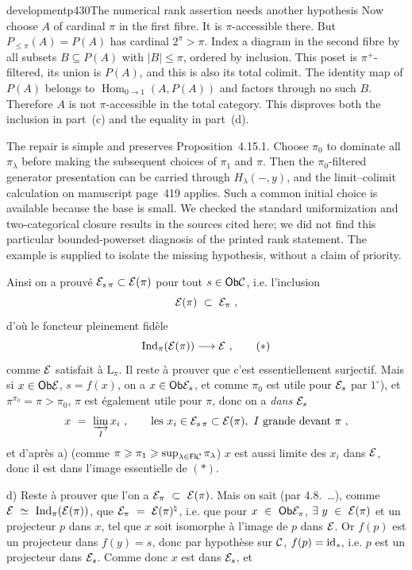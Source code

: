 \begin{dcomment}{development}{p430}{The numerical rank assertion needs another hypothesis}
Now choose $A$ of cardinal $\pi$ in the first fibre. It is $\pi$-accessible there. But $P_{\leq\pi}(A)=P(A)$ has cardinal $2^\pi>\pi$. Index a diagram in the second fibre by all subsets $B\subseteq P(A)$ with $|B|\leq\pi$, ordered by inclusion. This poset is $\pi^+$-filtered, its union is $P(A)$, and this is also its total colimit. The identity map of $P(A)$ belongs to $\operatorname{Hom}_{0\to1}(A,P(A))$ and factors through no such $B$. Therefore $A$ is not $\pi$-accessible in the total category. This disproves both the inclusion in part~(c) and the equality in part~(d).\par

The repair is simple and preserves Proposition~4.15.1. Choose $\pi_0$ to dominate all $\pi_\lambda$ before making the subsequent choices of $\pi_1$ and $\pi$. Then the $\pi_0$-filtered generator presentation can be carried through $H_\lambda(-,y)$, and the limit--colimit calculation on manuscript page~419 applies. Such a common initial choice is available because the base is small. We checked the standard uniformization and two-categorical closure results in the sources cited here; we did not find this particular bounded-powerset diagnosis of the printed rank statement. The example is supplied to isolate the missing hypothesis, without a claim of priority.
\end{dcomment}


Ainsi on a prouvé $\mathcal{E}_{s\,\pi} \subset \mathcal{E}(\pi)$ pour tout $s \in \mathsf{Ob} \mathcal{C}$, i.e. l'inclusion
\[
\cE(\pi) \ \subset \ \cE_{\pi} \ ,
\]
d'où le foncteur pleinement fidèle
\[
\Ind_{\pi}(\cE(\pi)) \longrightarrow \cE \ , \tag*{$(*)$}
\]
comme $\mathcal{E}$ satisfait à $\mathrm{L}_{\pi}$. Il reste à prouver que c'est essentiellement surjectif. Mais si $x \in \mathsf{Ob} \mathcal{E}$, $s = f(x)$, on a $x \in \mathsf{Ob} \mathcal{E}_s$, et comme $\pi_0$ est utile pour $\mathcal{E}_s$ par $1^{\circ}$), et $\pi^{\pi_0} = \pi > \pi_0$,
$\pi$ est également utile pour $\pi$, donc on a \textit{dans} $\mathcal{E}_s$ %
\[
x \ = \ \varinjlim_{I} x_i \ , \qquad \text{les } x_i \in \cE_{s\,\pi} \subset \cE(\pi),\ I \text{ grande devant } \pi \ ,
\]
et d'après a) (comme $\pi \geqslant \pi_1 \geqslant \sup_{\lambda \in \mathsf{Fl} \mathcal{C}} \pi_{\lambda}$) $x$ est aussi limite des $x_i$ dans $\mathcal{E}$, donc il est dans l'image essentielle de $(*)$.

d) Reste à prouver que l'on a $\cE_{\pi} \ \subset \ \cE(\pi)$. Mais on sait (par 4.8.~\dots), comme $\mathcal{E} \ \simeq \ \operatorname{Ind}_{\pi}(\mathcal{E}(\pi))$, que $\mathcal{E}_{\pi} \ = \ \mathcal{E}(\pi)^{\natural}$, i.e. que pour $x \ \in \ \mathsf{Ob} \mathcal{E}_{\pi}$, $\exists \ y \ \in \ \cE(\pi)$ et un projecteur $p$ dans $x$, tel que $x$ soit isomorphe à l'image de $p$ dans $\mathcal{E}$. Or $f(p)$ est un projecteur dans $f(y) = s$, donc par hypothèse sur $\mathcal{C}$, $f(p) = \mathrm{id}_s$, i.e. $p$ est un projecteur dans $\mathcal{E}_s$. Comme donc $x$ est dans $\mathcal{E}_s$, et

